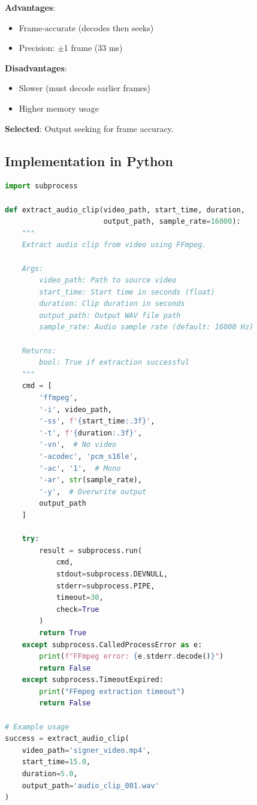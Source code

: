 \documentclass[11pt,a4paper]{article}
\begin{document}
\textbf{Advantages}:
\begin{itemize}
    \item Frame-accurate (decodes then seeks)
    \item Precision: $\pm$1 frame (33 ms)
\end{itemize}

\textbf{Disadvantages}:
\begin{itemize}
    \item Slower (must decode earlier frames)
    \item Higher memory usage
\end{itemize}

\textbf{Selected}: Output seeking for frame accuracy.

\subsection{Implementation in Python}

\begin{lstlisting}[language=Python]
import subprocess

def extract_audio_clip(video_path, start_time, duration, 
                       output_path, sample_rate=16000):
    """
    Extract audio clip from video using FFmpeg.
    
    Args:
        video_path: Path to source video
        start_time: Start time in seconds (float)
        duration: Clip duration in seconds
        output_path: Output WAV file path
        sample_rate: Audio sample rate (default: 16000 Hz)
    
    Returns:
        bool: True if extraction successful
    """
    cmd = [
        'ffmpeg',
        '-i', video_path,
        '-ss', f'{start_time:.3f}',
        '-t', f'{duration:.3f}',
        '-vn',  # No video
        '-acodec', 'pcm_s16le',
        '-ac', '1',  # Mono
        '-ar', str(sample_rate),
        '-y',  # Overwrite output
        output_path
    ]
    
    try:
        result = subprocess.run(
            cmd,
            stdout=subprocess.DEVNULL,
            stderr=subprocess.PIPE,
            timeout=30,
            check=True
        )
        return True
    except subprocess.CalledProcessError as e:
        print(f"FFmpeg error: {e.stderr.decode()}")
        return False
    except subprocess.TimeoutExpired:
        print("FFmpeg extraction timeout")
        return False

# Example usage
success = extract_audio_clip(
    video_path='signer_video.mp4',
    start_time=15.0,
    duration=5.0,
    output_path='audio_clip_001.wav'
)
\end{lstlisting}
\end{document}
